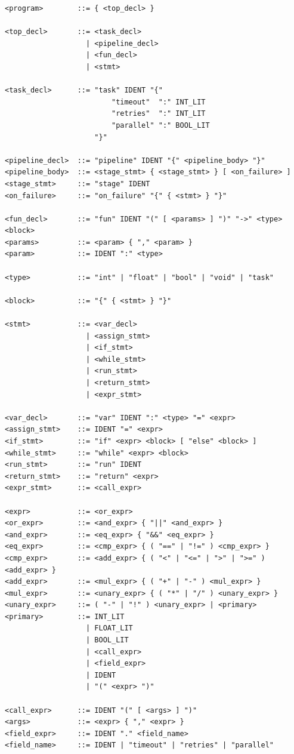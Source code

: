\documentclass[10pt,a4paper]{article}
\begin{document}
\begin{lstlisting}[language={}, caption={WorkflowScript EBNF grammar}]
<program>        ::= { <top_decl> }

<top_decl>       ::= <task_decl>
                   | <pipeline_decl>
                   | <fun_decl>
                   | <stmt>

<task_decl>      ::= "task" IDENT "{"
                         "timeout"  ":" INT_LIT
                         "retries"  ":" INT_LIT
                         "parallel" ":" BOOL_LIT
                     "}"

<pipeline_decl>  ::= "pipeline" IDENT "{" <pipeline_body> "}"
<pipeline_body>  ::= <stage_stmt> { <stage_stmt> } [ <on_failure> ]
<stage_stmt>     ::= "stage" IDENT
<on_failure>     ::= "on_failure" "{" { <stmt> } "}"

<fun_decl>       ::= "fun" IDENT "(" [ <params> ] ")" "->" <type> <block>
<params>         ::= <param> { "," <param> }
<param>          ::= IDENT ":" <type>

<type>           ::= "int" | "float" | "bool" | "void" | "task"

<block>          ::= "{" { <stmt> } "}"

<stmt>           ::= <var_decl>
                   | <assign_stmt>
                   | <if_stmt>
                   | <while_stmt>
                   | <run_stmt>
                   | <return_stmt>
                   | <expr_stmt>

<var_decl>       ::= "var" IDENT ":" <type> "=" <expr>
<assign_stmt>    ::= IDENT "=" <expr>
<if_stmt>        ::= "if" <expr> <block> [ "else" <block> ]
<while_stmt>     ::= "while" <expr> <block>
<run_stmt>       ::= "run" IDENT
<return_stmt>    ::= "return" <expr>
<expr_stmt>      ::= <call_expr>

<expr>           ::= <or_expr>
<or_expr>        ::= <and_expr> { "||" <and_expr> }
<and_expr>       ::= <eq_expr> { "&&" <eq_expr> }
<eq_expr>        ::= <cmp_expr> { ( "==" | "!=" ) <cmp_expr> }
<cmp_expr>       ::= <add_expr> { ( "<" | "<=" | ">" | ">=" ) <add_expr> }
<add_expr>       ::= <mul_expr> { ( "+" | "-" ) <mul_expr> }
<mul_expr>       ::= <unary_expr> { ( "*" | "/" ) <unary_expr> }
<unary_expr>     ::= ( "-" | "!" ) <unary_expr> | <primary>
<primary>        ::= INT_LIT
                   | FLOAT_LIT
                   | BOOL_LIT
                   | <call_expr>
                   | <field_expr>
                   | IDENT
                   | "(" <expr> ")"

<call_expr>      ::= IDENT "(" [ <args> ] ")"
<args>           ::= <expr> { "," <expr> }
<field_expr>     ::= IDENT "." <field_name>
<field_name>     ::= IDENT | "timeout" | "retries" | "parallel"
\end{lstlisting}
\end{document}
